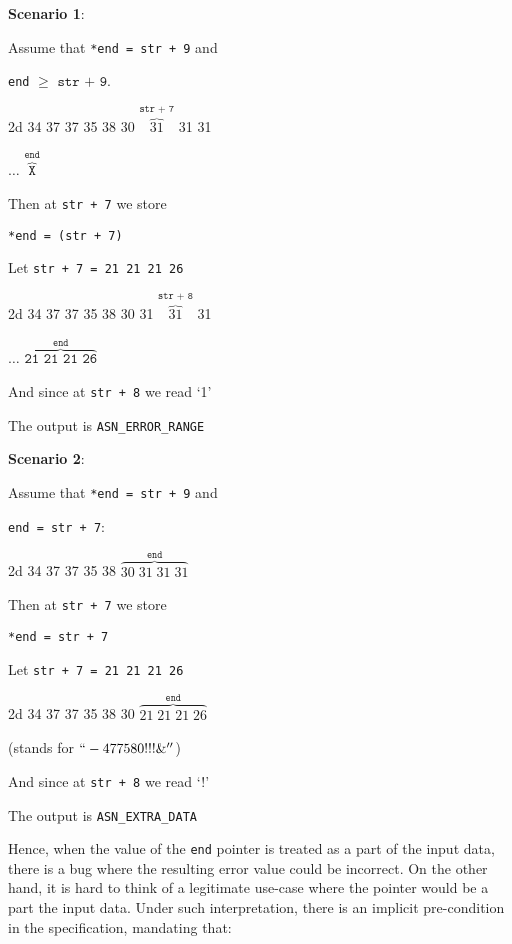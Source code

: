 \documentclass{article}
\begin{document}
\begin{multicols}{2}
  
    {\bf Scenario 1}:

    Assume that \texttt{*end = str + 9} and

    \texttt{end} $\geq$ $\texttt{str + 9}$.

    {\color{red}2d 34 37 37 35 38 30 {\color{blue}$\overbrace{31}^{\texttt{str + 7}}$} 31 31

      $\ldots$ $\overbrace{\texttt{X}}^{\texttt{end}}$}

    Then at \texttt{str + 7} we store

    \texttt{*end = (str + 7)}

     Let \texttt{str + 7 = 21 21 21 26} 

     {\color{red}2d 34 37 37 35 38 30 31 {\color{blue} $\overbrace{31}^{\texttt{str + 8}}$} 31

       $\ldots$ $\overbrace{\texttt{21 21 21 26}}^{\texttt{end}}$}
     
     
     And since at \texttt{str + 8} we read `1'
     

     
     The output is  {\color{green}\texttt{ASN\_ERROR\_RANGE}}
     
     \columnbreak
     
    {\bf Scenario 2}:

    Assume that \texttt{*end = str + 9} and

    \texttt{end = str + 7}:
    
    {\color{red}2d 34 37 37 35 38 {\color{blue} $\overbrace{30 \; 31 \; 31 \; 31}^{\texttt{end}}$}}
    

    Then at \texttt{str + 7} we store

    \texttt{*end = str + 7}

     Let \texttt{str + 7 = 21 21 21 26} 

   
    {\color{red}2d 34 37 37 35 38 30 {\color{blue}$\overbrace{21 \; 21 \; 21 \; 26}^{\texttt{end}}$}}

    (stands for $``-477580!!!\&''$)

    And since at \texttt{str + 8} we read `!' 

    The output is {\color{red}\texttt{ASN\_EXTRA\_DATA}}
    \end{multicols}
    

Hence, when the value of the \texttt{end} pointer is treated as a part of the input data, there is a bug where the resulting error value could be incorrect. On the other hand, it is hard to think of a legitimate use-case where the pointer would be a part the input data. Under such interpretation, there is an implicit pre-condition in the specification, mandating that:
\end{document}

